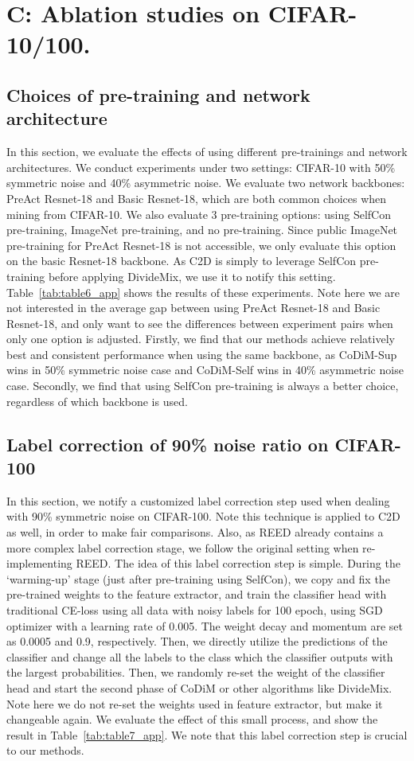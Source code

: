 \documentclass[letterpaper]{article} \usepackage{aaai22}  \usepackage{times}  \usepackage{helvet}  \usepackage{courier}  \usepackage[hyphens]{url}  \usepackage{graphicx} \usepackage{subfigure}
\begin{document}
\section{C: Ablation studies on CIFAR-10/100.}
\subsection{Choices of pre-training and network architecture}
In this section, we evaluate the effects of using different pre-trainings and network architectures. We conduct experiments under two settings: CIFAR-10 with 50\% symmetric noise and 40\% asymmetric noise. We evaluate two network backbones: PreAct Resnet-18 and Basic Resnet-18, which are both common choices when mining from CIFAR-10. We also evaluate 3 pre-training options: using SelfCon pre-training, ImageNet pre-training, and no pre-training. Since public ImageNet pre-training for PreAct Resnet-18 is not accessible, we only evaluate this option on the basic Resnet-18 backbone. As C2D is simply to leverage SelfCon pre-training before applying DivideMix, we use it to notify this setting. Table~\ref{tab:table6_app} shows the results of these experiments. Note here we are not interested in the average gap between using PreAct Resnet-18 and Basic Resnet-18, and only want to see the differences between experiment pairs when only one option is adjusted.
Firstly, we find that our methods achieve relatively best and consistent performance when using the same backbone, as CoDiM-Sup wins in 50\% symmetric noise case and CoDiM-Self wins in 40\% asymmetric noise case. Secondly, we find that using SelfCon pre-training is always a better choice, regardless of which backbone is used. 



\subsection{Label correction of 90\% noise ratio on CIFAR-100}
In this section, we notify a customized label correction step used when dealing with 90\% symmetric noise on CIFAR-100. Note this technique is applied to C2D as well, in order to make fair comparisons. Also, as REED already contains a more complex label correction stage, we follow the original setting when re-implementing REED. The idea of this label correction step is simple. During the `warming-up' stage (just after pre-training using SelfCon), we copy and fix the pre-trained weights to the feature extractor, and train the classifier head with traditional CE-loss using all data with noisy labels for 100 epoch, using SGD optimizer with a learning rate of 0.005. The weight decay and momentum are set as 0.0005 and 0.9, respectively. Then, we directly utilize the predictions of the classifier and change all the labels to the class which the classifier outputs with the largest probabilities. Then, we randomly re-set the weight of the classifier head and start the second phase of CoDiM or other algorithms like DivideMix. Note here we do not re-set the weights used in feature extractor, but make it changeable again. We evaluate the effect of this small process, and show the result in Table~\ref{tab:table7_app}. We note that this label correction step is crucial to our methods.
\end{document}
